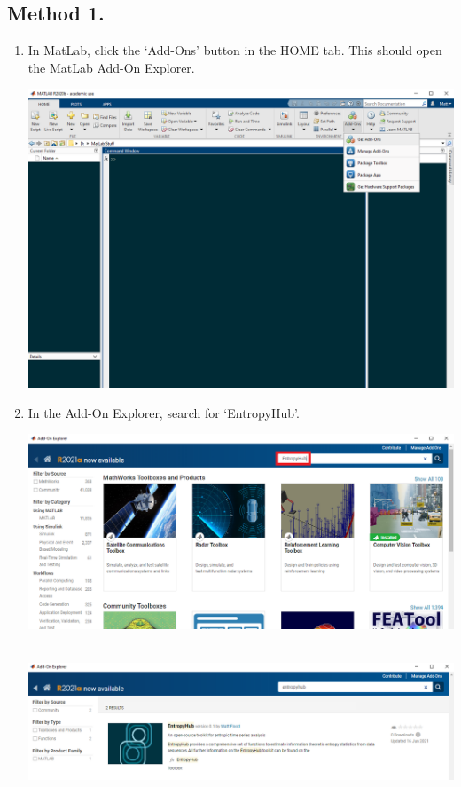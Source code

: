 \documentclass[12pt, a4paper, titlepage, openany]{book}
\begin{document}
\subsection*{\normalsize Method 1.}
\begin{enumerate}	
\item In MatLab, click the ‘Add-Ons’ button in the HOME tab. This should open the MatLab Add-On Explorer.\\
\begin{minipage}[h]{\linewidth}
          \centering
          \includegraphics[scale=.45]{matscreen1.png}
          \medskip
\end{minipage}
\item In the Add-On Explorer, search for ‘EntropyHub’.\\
\begin{minipage}[h]{\linewidth}
          \centering
          \includegraphics[scale=.45]{matscreen2.png}\\ \ \\
          \medskip
\end{minipage}
\begin{minipage}[h]{\linewidth}
          \centering
          \includegraphics[scale=.45]{matscreen3.png}\\ \ \\
          \medskip
\end{minipage}


\end{enumerate}
\end{document}
